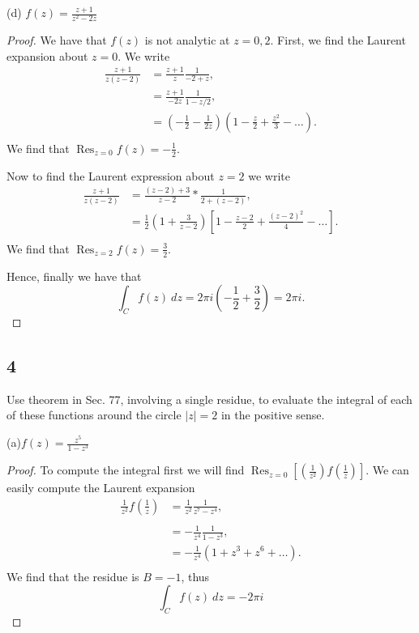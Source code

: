 \documentclass{article}
\DeclareMathOperator*{\Res}{Res}
\begin{document}
(d) $f(z) = \frac{z + 1}{z^2 - 2z}$
\begin{proof}
    We have that $f(z)$ is not analytic at $z=0,2$. First, we find the Laurent
    expansion about $z =0$. We write
    \begin{align*}
        \frac{z+1}{z(z-2)} & = \frac{z+1}{z}\frac{1}{-2+z},                  \\
                           & = \frac{z+1}{-2z} \frac{1}{1-z/2},              \\
                           & = (-\frac{1}{2} - \frac{1}{2z})(1 - \frac{z}{2}
        + \frac{z^2}{3} - \dots ).                                           \\
    \end{align*}
    We find that $\Res_{z=0} f(z) = -\frac{1}{2}$.

    Now to find the Laurent expression about $z =2$ we write
    \begin{align*}
        \frac{z+1}{z(z-2)} & =\frac{(z-2) + 3}{z-2} * \frac{1}{2 + (z-2)}, \\
                           & = \frac{1}{2}(1 + \frac{3}{z-2})
        \left[1 - \frac{z-2}{2} + \frac{(z-2)^2}{4} - \dots\right].        \\
    \end{align*}
    We find that $\Res_{z=2} f(z) = \frac{3}{2}$.

    Hence, finally we have that
    \[\int_C f(z) \ dz = 2\pi i(-\frac{1}{2} + \frac{3}{2}) = 2\pi i.\]
\end{proof}

\subsection*{4}
Use theorem in Sec. 77, involving a single residue, to evaluate the integral
of each of these functions around the circle $|z|=2$ in the positive sense.

(a)$f(z) = \frac{z^5}{1-z^3}$
\begin{proof}
    To compute the integral first we will find
    ${\Res_{z=0}[(\frac{1}{z^2})f(\frac{1}{z})]}$. We can easily compute the
    Laurent expansion
    \begin{align*}
        \frac{1}{z^2}f(\frac{1}{z}) & = \frac{1}{z^2}\frac{1}{z^7 - z^4},      \\                                         \\
                                    & = -\frac{1}{z^4}\frac{1}{1-z^3},         \\
                                    & = -\frac{1}{z^4}(1 + z^3 + z^6 + \dots). \\
    \end{align*}
    We find that the residue is $B = -1$, thus
    \[\int_C f(z) \ dz = -2\pi i\]
\end{proof}
\end{document}
